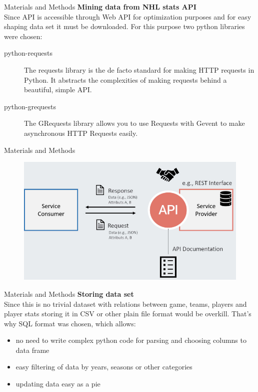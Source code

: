 \begin{frame}{Materials and Methods}
    \textbf{Mining data from NHL stats API}\\
    \vspace{2em}
    Since API is accessible through Web API for optimization purposes and for easy shaping data set it must be downloaded. For this purpose two python libraries were chosen:
    
    \begin{description}
        \item[python-requests] The requests library is the de facto standard for making HTTP requests in Python. It abstracts the complexities of making requests behind a beautiful, simple API.
        
        \item[python-grequests] The GRequests library allows you to use Requests with Gevent to make asynchronous HTTP Requests easily.
    \end{description}
\end{frame}    
    
\begin{frame}{Materials and Methods}
    \begin{figure}[H]
        \includegraphics[width=\textwidth]{greg}
    \end{figure}
\end{frame}

\begin{frame}{Materials and Methods}
    \textbf{Storing data set}\\
    \vspace{2em}
    Since this is no trivial dataset with relations between game, teams, players and player stats storing it in CSV or other plain file format would be overkill. That's why SQL format was chosen, which allows:
    
    \begin{itemize}
        \item no need to write complex python code for parsing and choosing columns to data frame
        \item easy filtering of data by years, seasons or other categories
        \item updating data easy as a pie
    \end{itemize}
\end{frame}

